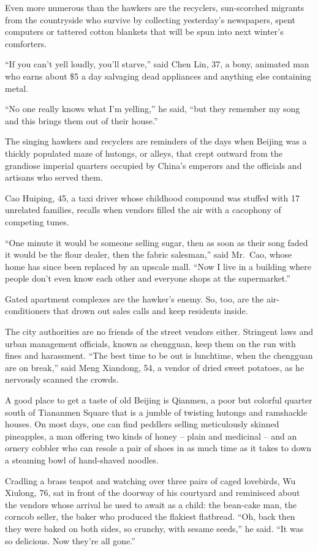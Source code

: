 ﻿\documentclass[12pt]{article}
\begin{document}
Even more numerous than the hawkers are the recyclers, sun-scorched migrants from the countryside
who survive by collecting yesterday's newspapers, spent computers or tattered cotton blankets that
will be spun into next winter's comforters.

``If you can't yell loudly, you'll starve,'' said Chen Lin, 37, a bony, animated man who earns about
\$5 a day salvaging dead appliances and anything else containing metal.

``No one really knows what I'm yelling,'' he said, ``but they remember my song and this brings them
out of their house.''

The singing hawkers and recyclers are reminders of the days when Beijing was a thickly populated
maze of hutongs, or alleys, that crept outward from the grandiose imperial quarters occupied by
China's emperors and the officials and artisans who served them.

Cao Huiping, 45, a taxi driver whose childhood compound was stuffed with 17 unrelated families,
recalls when vendors filled the air with a cacophony of competing tunes.

``One minute it would be someone selling sugar, then as soon as their song faded it would be the
flour dealer, then the fabric salesman,'' said Mr.~Cao, whose home has since been replaced by an
upscale mall. ``Now I live in a building where people don't even know each other and everyone shops
at the supermarket.''

Gated apartment complexes are the hawker's enemy. So, too, are the air-conditioners that drown out
sales calls and keep residents inside.

The city authorities are no friends of the street vendors either. Stringent laws and urban
management officials, known as chengguan, keep them on the run with fines and harassment. ``The best
time to be out is lunchtime, when the chengguan are on break,'' said Meng Xiandong, 54, a vendor of
dried sweet potatoes, as he nervously scanned the crowds.

A good place to get a taste of old Beijing is Qianmen, a poor but colorful quarter south of
Tiananmen Square that is a jumble of twisting hutongs and ramshackle houses. On most days, one can
find peddlers selling meticulously skinned pineapples, a man offering two kinds of honey -- plain
and medicinal -- and an ornery cobbler who can resole a pair of shoes in as much time as it takes to
down a steaming bowl of hand-shaved noodles.

Cradling a brass teapot and watching over three pairs of caged lovebirds, Wu Xiulong, 76, sat in
front of the doorway of his courtyard and reminisced about the vendors whose arrival he used to
await as a child: the bean-cake man, the corncob seller, the baker who produced the flakiest
flatbread. ``Oh, back then they were baked on both sides, so crunchy, with sesame seeds,'' he said.
``It was so delicious. Now they're all gone.''
\end{document}
